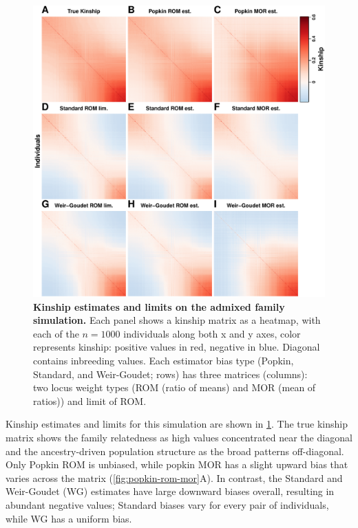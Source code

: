 \documentclass[11pt]{article}
\begin{document}
\begin{figure}[bp!]
  \centering
  \includegraphics[height=0.8\textheight]{sim-admix-n1000-m100000-k3-f0.3-s0.5-mc100-h0.8-g20-fes/kinship.pdf}
  \caption{
    {\bf Kinship estimates and limits on the admixed family simulation.}
    Each panel shows a kinship matrix as a heatmap, with each of the $n=1000$ individuals along both x and y axes, color represents kinship: positive values in red, negative in blue.
    Diagonal contains inbreeding values.
    Each estimator bias type (Popkin, Standard, and Weir-Goudet; rows) has three matrices (columns): two locus weight types (ROM (ratio of means) and MOR (mean of ratios)) and limit of ROM.
  }
  \label{fig:kinship_sim}
\end{figure}

Kinship estimates and limits for this simulation are shown in \cref{fig:kinship_sim}.
The true kinship matrix shows the family relatedness as high values concentrated near the diagonal and the ancestry-driven population structure as the broad patterns off-diagonal.
Only Popkin ROM is unbiased, while popkin MOR has a slight upward bias that varies across the matrix (\cref{fig:popkin-rom-mor}A).
In contrast, the Standard and Weir-Goudet (WG) estimates have large downward biases overall, resulting in abundant negative values; Standard biases vary for every pair of individuals, while WG has a uniform bias.
\end{document}
